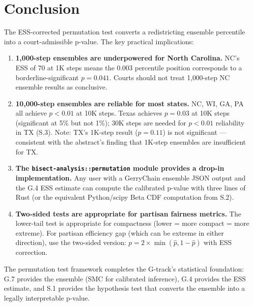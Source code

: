 \section{Conclusion}

The ESS-corrected permutation test converts a redistricting ensemble percentile
into a court-admissible p-value. The key practical implications:

\begin{enumerate}
  \item \textbf{1{,}000-step ensembles are underpowered for North Carolina.}
    NC's ESS of 70 at 1K steps means the 0.003 percentile position corresponds
    to a borderline-significant $p = 0.041$.
    Courts should not treat 1{,}000-step NC ensemble results as conclusive.
  \item \textbf{10{,}000-step ensembles are reliable for most states.}
    NC, WI, GA, PA all achieve $p < 0.01$ at 10K steps.
    Texas achieves $p = 0.03$ at 10K steps (significant at 5\% but not 1\%);
    30K steps are needed for $p < 0.01$ reliability in TX (S.3).
    Note: TX's 1K-step result ($p = 0.11$) is not significant --- consistent with the
    abstract's finding that 1K-step ensembles are insufficient for TX.
  \item \textbf{The \texttt{bisect-analysis::permutation} module provides
    a drop-in implementation.}
    Any user with a GerryChain ensemble JSON output and the G.4 ESS estimate
    can compute the calibrated p-value with three lines of Rust
    (or the equivalent Python/scipy Beta CDF computation from S.2).
  \item \textbf{Two-sided tests are appropriate for partisan fairness metrics.}
    The lower-tail test is appropriate for compactness (lower = more compact
    = more extreme). For partisan efficiency gap (which can be extreme in either
    direction), use the two-sided version: $p = 2 \times \min(\hat{p}, 1-\hat{p})$
    with ESS correction.
\end{enumerate}

The permutation test framework completes the G-track's statistical foundation:
G.7 provides the ensemble (SMC for calibrated inference), G.4 provides the ESS
estimate, and S.1 provides the hypothesis test that converts the ensemble into
a legally interpretable p-value.
